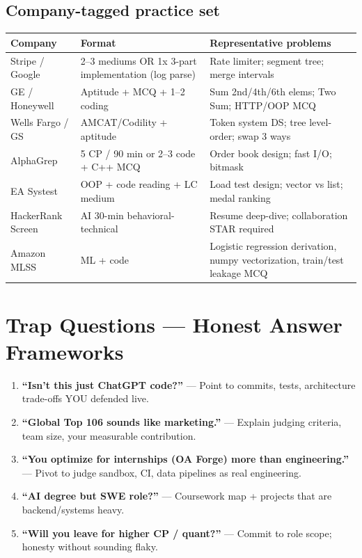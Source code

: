 \documentclass[9pt,a4paper]{article}
\begin{document}
\subsection{Company-tagged practice set}
\begin{longtable}{@{}p{2.5cm}p{4cm}p{8cm}@{}}
\toprule
\textbf{Company} & \textbf{Format} & \textbf{Representative problems} \\
\midrule
Stripe / Google & 2--3 mediums OR 1x 3-part implementation (log parse) & Rate limiter; segment tree; merge intervals \\
GE / Honeywell & Aptitude + MCQ + 1--2 coding & Sum 2nd/4th/6th elems; Two Sum; HTTP/OOP MCQ \\
Wells Fargo / GS & AMCAT/Codility + aptitude & Token system DS; tree level-order; swap 3 ways \\
AlphaGrep & 5 CP / 90 min or 2--3 code + C++ MCQ & Order book design; fast I/O; bitmask \\
EA Systest & OOP + code reading + LC medium & Load test design; vector vs list; medal ranking \\
HackerRank Screen & AI 30-min behavioral-technical & Resume deep-dive; collaboration STAR required \\
Amazon MLSS & ML + code & Logistic regression derivation, numpy vectorization, train/test leakage MCQ \\
\bottomrule
\end{longtable}

\section{Trap Questions --- Honest Answer Frameworks}
\begin{enumerate}
  \item \textbf{``Isn't this just ChatGPT code?''} --- Point to commits, tests, architecture trade-offs YOU defended live.
  \item \textbf{``Global Top 106 sounds like marketing.''} --- Explain judging criteria, team size, your measurable contribution.
  \item \textbf{``You optimize for internships (OA Forge) more than engineering.''} --- Pivot to judge sandbox, CI, data pipelines as real engineering.
  \item \textbf{``AI degree but SWE role?''} --- Coursework map + projects that are backend/systems heavy.
  \item \textbf{``Will you leave for higher CP / quant?''} --- Commit to role scope; honesty without sounding flaky.
\end{enumerate}
\end{document}

